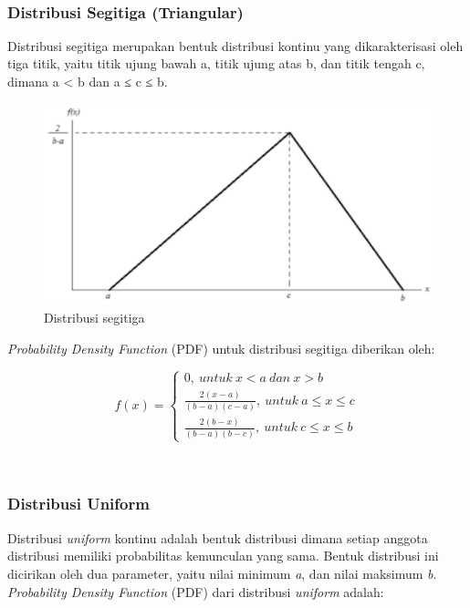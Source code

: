 \documentclass[
]{book}
\begin{document}
~

\hypertarget{distribusi-segitiga-triangular}{%
\subsubsection{Distribusi Segitiga (Triangular)}\label{distribusi-segitiga-triangular}}

Distribusi segitiga merupakan bentuk distribusi kontinu yang dikarakterisasi oleh tiga titik, yaitu titik ujung bawah a, titik ujung atas b, dan titik tengah c, dimana a \textless{} b dan a ≤ c ≤ b.

\begin{figure}

{\centering \includegraphics[width=0.5\linewidth]{images/screening/distribusi_segitiga} 

}

\caption{Distribusi segitiga}\label{fig:unnamed-chunk-7}
\end{figure}

\emph{Probability Density Function} (PDF) untuk distribusi segitiga diberikan oleh:

\[
f(x) =
\begin{cases}
  0,\ untuk\ x < a\ dan\ x > b\\ 
  \frac{2(x-a)}{(b-a)(c-a)},\ untuk\ a \leq x \leq c \\
  \frac{2(b-x)}{(b-a)(b-c)},\ untuk\ c \leq x \leq b
\end{cases}       
\]

~

\hypertarget{distribusi-uniform}{%
\subsubsection{Distribusi Uniform}\label{distribusi-uniform}}

Distribusi \emph{uniform} kontinu adalah bentuk distribusi dimana setiap anggota distribusi memiliki probabilitas kemunculan yang sama. Bentuk distribusi ini dicirikan oleh dua parameter, yaitu nilai minimum \emph{a}, dan nilai maksimum \emph{b}. \emph{Probability Density Function} (PDF) dari distribusi \emph{uniform} adalah:
\end{document}
